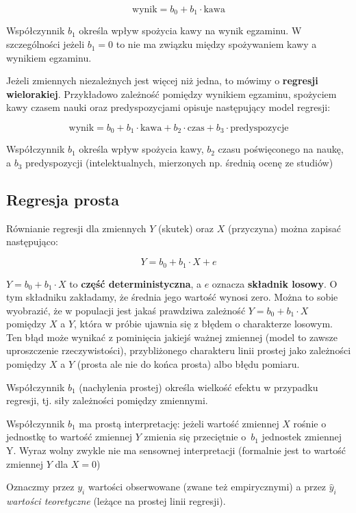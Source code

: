 \documentclass[
  openany]{book}
\begin{document}
\[ \textrm{wynik} = b_0 + b_1 \cdot \textrm{kawa}\]

Współczynnik \(b_1\) określa wpływ spożycia kawy na wynik egzaminu.
W szczególności jeżeli \(b_1 = 0\) to
nie ma związku między spożywaniem kawy a wynikiem egzaminu.

Jeżeli zmiennych niezależnych jest więcej niż jedna,
to mówimy o \textbf{regresji wielorakiej}. Przykładowo
zależność
pomiędzy wynikiem egzaminu, spożyciem kawy czasem nauki oraz predyspozycjami
opisuje następujący model regresji:

\[\textrm{wynik} = b_0 + b_1 \cdot \textrm{kawa} + b_2 \cdot \textrm{czas} + b_3 \cdot \textrm{predyspozycje} \]

Współczynnik \(b_1\) określa wpływ spożycia kawy,
\(b_2\) czasu poświęconego na naukę,
a \(b_3\) predyspozycji
(intelektualnych, mierzonych np. średnią ocenę ze studiów)

\hypertarget{regresja-prosta}{%
\subsection{Regresja prosta}\label{regresja-prosta}}

Równianie regresji dla zmiennych \(Y\) (skutek) oraz \(X\) (przyczyna) można zapisać następująco:

\[Y = b_0 + b_1 \cdot X + e \]

\(Y = b_0 + b_1 \cdot X\) to \textbf{część deterministyczna},
a \(e\) oznacza \textbf{składnik losowy}.
O tym składniku zakładamy, że średnia jego wartość wynosi zero.
Można to sobie wyobrazić, że w populacji jest jakaś prawdziwa zależność
\(Y = b_0 + b_1 \cdot X\) pomiędzy \(X\) a \(Y\), która w próbie
ujawnia się z błędem o charakterze losowym. Ten błąd może wynikać
z pominięcia jakiejś ważnej zmiennej (model
to zawsze uproszczenie rzeczywistości), przybliżonego charakteru linii
prostej jako zależności pomiędzy \(X\) a \(Y\) (prosta ale nie do końca prosta)
albo błędu pomiaru.

Współczynnik \(b_1\) (nachylenia prostej) określa wielkość efektu
w przypadku regresji, tj. siły zależności pomiędzy zmiennymi.

Współczynnik \(b_1\) ma prostą interpretację: jeżeli wartość zmiennej \(X\)
rośnie o jednostkę to wartość zmiennej \(Y\) zmienia
się przeciętnie o~\(b_1\) jednostek zmiennej Y.
Wyraz wolny zwykle nie ma sensownej interpretacji
(formalnie jest to wartość zmiennej \(Y\) dla \(X=0\))

Oznaczmy przez \(y_i\) wartości obserwowane (zwane też empirycznymi)
a przez \(\hat y_i\) \emph{wartości teoretyczne} (leżące na prostej linii regresji).
\end{document}
